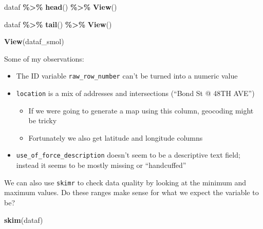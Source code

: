 \documentclass[
]{article}
\newenvironment{Shaded}{\begin{snugshade}}{\end{snugshade}}
\newcommand{\KeywordTok}[1]{\textcolor[rgb]{0.13,0.29,0.53}{\textbf{#1}}}
\newcommand{\NormalTok}[1]{#1}
\newcommand{\OperatorTok}[1]{\textcolor[rgb]{0.81,0.36,0.00}{\textbf{#1}}}
\newcommand{\StringTok}[1]{\textcolor[rgb]{0.31,0.60,0.02}{#1}}
\providecommand{\tightlist}{%
  \setlength{\itemsep}{0pt}\setlength{\parskip}{0pt}}
\begin{document}
\begin{Shaded}
\begin{Highlighting}[]
\NormalTok{dataf }\OperatorTok{\%\textgreater{}\%}\StringTok{ }
\StringTok{    }\KeywordTok{head}\NormalTok{() }\OperatorTok{\%\textgreater{}\%}\StringTok{ }
\StringTok{    }\KeywordTok{View}\NormalTok{()}

\NormalTok{dataf }\OperatorTok{\%\textgreater{}\%}\StringTok{ }
\StringTok{    }\KeywordTok{tail}\NormalTok{() }\OperatorTok{\%\textgreater{}\%}\StringTok{ }
\StringTok{    }\KeywordTok{View}\NormalTok{()}

\KeywordTok{View}\NormalTok{(dataf\_smol)}
\end{Highlighting}
\end{Shaded}

Some of my observations:

\begin{itemize}
\tightlist
\item
  The ID variable \texttt{raw\_row\_number} can't be turned into a numeric value
\item
  \texttt{location} is a mix of addresses and intersections (``Bond St @ 48TH AVE'')

  \begin{itemize}
  \tightlist
  \item
    If we were going to generate a map using this column, geocoding might be tricky
  \item
    Fortunately we also get latitude and longitude columns
  \end{itemize}
\item
  \texttt{use\_of\_force\_description} doesn't seem to be a descriptive text field; instead it seems to be mostly missing or ``handcuffed''
\end{itemize}

We can also use \texttt{skimr} to check data quality by looking at the minimum and maximum values. Do these ranges make sense for what we expect the variable to be?

\begin{Shaded}
\begin{Highlighting}[]
\KeywordTok{skim}\NormalTok{(dataf)}
\end{Highlighting}
\end{Shaded}
\end{document}
